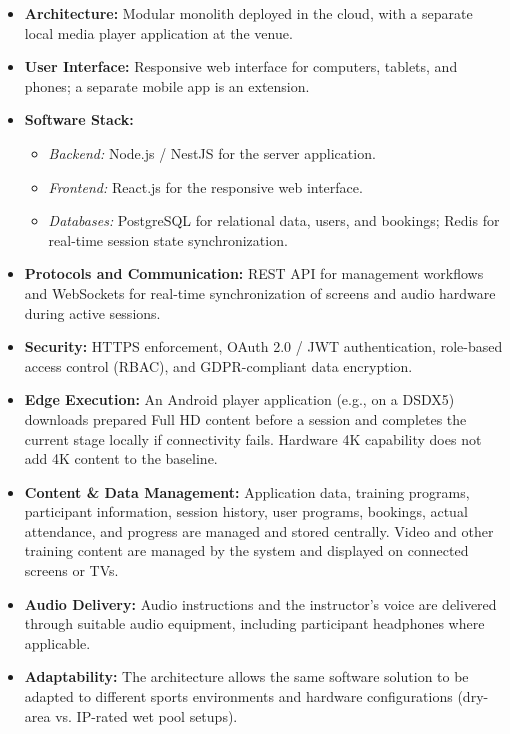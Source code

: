 \documentclass[a4paper,11pt]{article}
\begin{document}
\begin{itemize}
    \item \textbf{Architecture:} Modular monolith deployed in the cloud, with a separate local media player application at the venue.
    \item \textbf{User Interface:} Responsive web interface for computers, tablets, and phones; a separate mobile app is an extension.
    \item \textbf{Software Stack:} 
    \begin{itemize}
        \item \textit{Backend:} Node.js / NestJS for the server application.
        \item \textit{Frontend:} React.js for the responsive web interface.
        \item \textit{Databases:} PostgreSQL for relational data, users, and bookings; Redis for real-time session state synchronization.
    \end{itemize}
    \item \textbf{Protocols and Communication:} REST API for management workflows and WebSockets for real-time synchronization of screens and audio hardware during active sessions.
    \item \textbf{Security:} HTTPS enforcement, OAuth 2.0 / JWT authentication, role-based access control (RBAC), and GDPR-compliant data encryption.
    \item \textbf{Edge Execution:} An Android player application (e.g., on a DSDX5) downloads prepared Full HD content before a session and completes the current stage locally if connectivity fails. Hardware 4K capability does not add 4K content to the baseline.
    \item \textbf{Content \& Data Management:} Application data, training programs, participant information, session history, user programs, bookings, actual attendance, and progress are managed and stored centrally. Video and other training content are managed by the system and displayed on connected screens or TVs.
    \item \textbf{Audio Delivery:} Audio instructions and the instructor's voice are delivered through suitable audio equipment, including participant headphones where applicable.
    \item \textbf{Adaptability:} The architecture allows the same software solution to be adapted to different sports environments and hardware configurations (dry-area vs. IP-rated wet pool setups).
\end{itemize}
\end{document}
